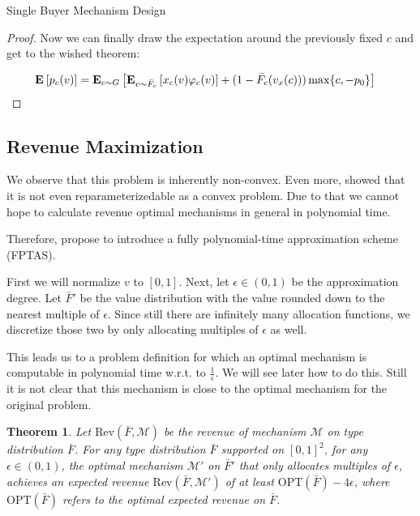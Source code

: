 \documentclass[11pt,a4paper]{article}
\newtheorem{theorem}{Theorem}
\newcommand{\Ex}[2][]{\mbox{\rm\bf E}_{#1}\left[#2\right]}
\newcommand{\1}[1]{\mbox{\rm\bf 1}_{#1}}
\begin{document}
\begin{section}{Single Buyer Mechanism Design}
\begin{proof}
     Now we can finally draw the expectation around the previously fixed $c$ and get to the wished theorem:

     \begin{align*}
         \Ex{p_c(v)} & = \Ex[c \sim G]{\Ex[v \sim \bar{F}_c]{x_c(v) \varphi_c(v)} + (1 - \bar{F}_{c}(v_x(c))) \max\{c, -p_0\} }
     \end{align*}
 \end{proof}

 \subsection{Revenue Maximization}

 We observe that this problem is inherently non-convex. Even more, \cite{primary} showed that it is not even reparameterizedable as a convex problem.
 Due to that we cannot hope to calculate revenue optimal mechanisms in general in polynomial time.

 Therefore, \cite{primary} propose to introduce a fully polynomial-time approximation scheme (FPTAS).

 First we will normalize $v$ to $[0,1]$.
 Next, let $\epsilon \in (0, 1)$ be the approximation degree.
 Let $\bar{F}'$ be the value distribution with the value rounded down to the nearest multiple of $\epsilon$.
 Since still there are infinitely many allocation functions, we discretize those two by only allocating multiples of $\epsilon$ as well.

 This leads us to a problem definition for which an optimal mechanism is computable in polynomial time w.r.t. to $\frac{1}{\epsilon}$.
 We will see later how to do this.
 Still it is not clear that this mechanism is close to the optimal mechanism for the original problem.

 \begin{theorem}
     \label{theorem:approximation-guarantee}
     Let $\mathrm{Rev}(\bar{F}, \mathcal{M})$ be the revenue of mechanism $\mathcal{M}$ on type distribution $\bar{F}$.
     For any type distribution $\bar{F}$ supported on $[0,1]^2$, for any $\epsilon \in (0,1)$,
     the optimal mechanism $\mathcal{M}'$ on $\bar{F}'$ that only allocates multiples of $\epsilon$, achieves an expected revenue $\mathrm{Rev}(\bar{F},\mathcal{M}')$ of at least
     $\mathrm{OPT}(\bar{F}) - 4\epsilon$, where $\mathrm{OPT}(\bar{F})$ refers to the optimal expected revenue on $\bar{F}$.
 \end{theorem}


\end{section}
\end{document}
